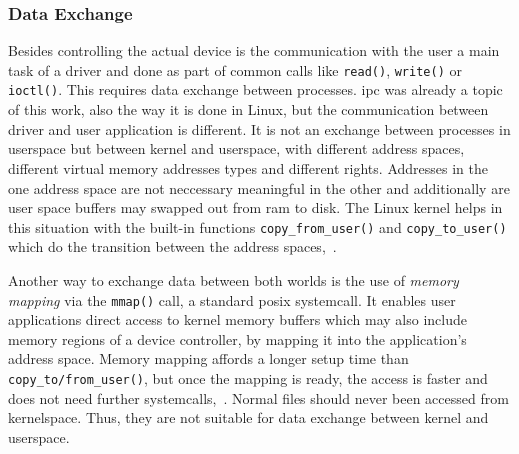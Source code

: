 \subsubsection*{Data Exchange}
Besides controlling the actual device is the communication with the user a main task of a driver and done as part of common calls like \texttt{read()}, \texttt{write()} or \texttt{ioctl()}.
This requires data exchange between processes.
\ac{ipc} was already a topic of this work, also the way it is done in Linux, but the communication between driver and user application is different.
It is not an exchange between processes in userspace but between kernel and userspace, with different address spaces, different virtual memory addresses types and different rights.
Addresses in the one address space are not neccessary meaningful in the other and additionally are user space buffers may swapped out from \ac{ram} to disk.
The Linux kernel helps in this situation with the built-in functions \texttt{copy\_from\_user()} and \texttt{copy\_to\_user()} which do the transition between the address spaces\cite{lfd430},~\cite{glatz2015betriebssysteme}.

Another way to exchange data between both worlds is the use of \textit{memory mapping} via the \texttt{mmap()} call, a standard \ac{posix} systemcall.
It enables user applications direct access to kernel memory buffers which may also include memory regions of a device controller, by mapping it into the application's address space.
Memory mapping affords a longer setup time than \texttt{copy\_to/from\_user()}, but once the mapping is ready, the access is faster and does not need further systemcalls\cite{lfd430},~\cite{glatz2015betriebssysteme}.
Normal files should never been accessed from kernelspace.
Thus, they are not suitable for data exchange between kernel and userspace\cite{lfd430}.

